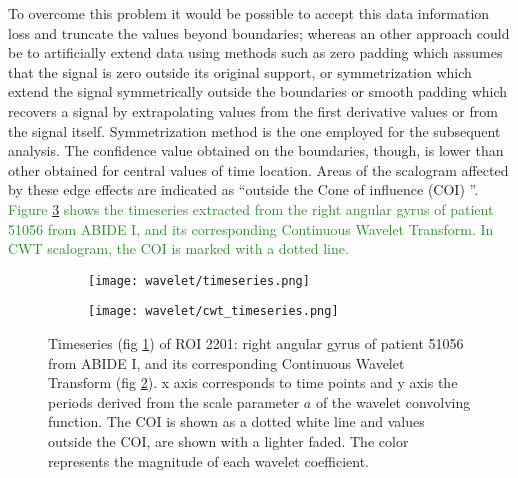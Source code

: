 \documentclass[11pt]{report}
\begin{document}
To overcome this problem it would be possible to accept this data information loss and truncate the values beyond boundaries; whereas an other approach could be to artificially extend data using methods such as zero padding which assumes that the signal is zero outside its original support, or symmetrization which extend the signal symmetrically outside the boundaries or smooth padding which recovers a signal by extrapolating values from the first derivative values or from the signal itself.
Symmetrization method is the one employed for the subsequent analysis.
The confidence value obtained on the boundaries, though, is lower than other obtained for central values of time location.
Areas of the scalogram affected by these edge effects are indicated as \textquotedblleft outside the Cone of influence (COI) \textquotedblright.
\textcolor{ForestGreen}{
Figure \ref{fig:cwt_timeseries} shows the timeseries extracted from the right angular gyrus of patient 51056 from ABIDE I, and its corresponding Continuous Wavelet Transform. In CWT scalogram, the COI is marked with a dotted line.
}

\begin{figure}
\begin{subfigure}{0.5\textwidth}
\texttt{[image: wavelet/timeseries.png]}
\caption{}
\label{fig:timeseries_cwt}
\end{subfigure}
\begin{subfigure}{0.5\textwidth}
\texttt{[image: wavelet/cwt\_timeseries.png]}
\caption{}
\label{fig:cwt}
\end{subfigure}
\caption{Timeseries (fig \ref{fig:timeseries_cwt}) of ROI 2201: right angular gyrus of patient 51056 from ABIDE I, and its corresponding Continuous Wavelet Transform  (fig \ref{fig:cwt}).
x axis corresponds to time points and y axis the periods derived from the scale parameter $a$ of the wavelet convolving function.
The COI is shown as a dotted white line and values outside the COI, are shown with a lighter faded.
The color represents the magnitude of each wavelet coefficient.}
\label{fig:cwt_timeseries}
\end{figure}
\end{document}
